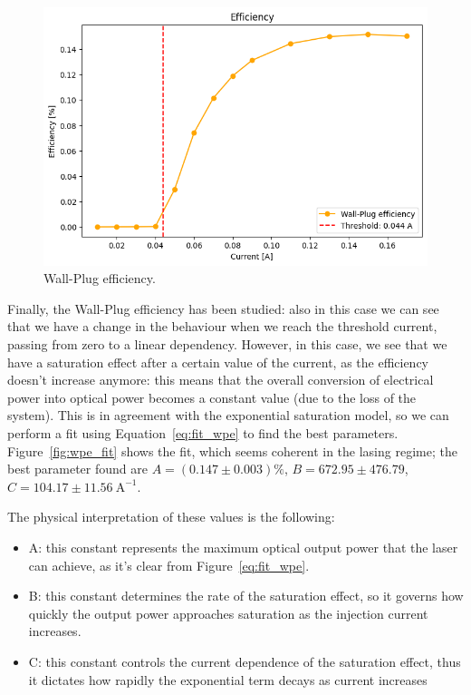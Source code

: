 \documentclass[prl,twocolumn]{revtex4-1}
\begin{document}
\begin{figure}[!b]
    \centering
    \includegraphics[width=\linewidth]{Images/wpe.png}
    \caption{Wall-Plug efficiency.}
    \label{fig:wpe}
\end{figure}

Finally, the Wall-Plug efficiency has been studied: also in this case we can see that we have a change in the behaviour when we reach the threshold current, passing from zero to a linear dependency. However, in this case, we see that we have a saturation effect after a certain value of the current, as the efficiency doesn't increase anymore: this means that the overall conversion of electrical power into optical
power becomes a constant value (due to the loss of the system). This is in agreement with the exponential saturation model, so we can perform a fit using Equation~\eqref{eq:fit_wpe} to find the best parameters. Figure~\ref{fig:wpe_fit} shows the fit, which seems coherent in the lasing regime; the best parameter found are $A = (0.147 \pm 0.003) \%$, $B = 672.95 \pm 476.79$, $C = 104.17 \pm 11.56 \SI{}{\ampere}^{-1}$. 

The physical interpretation of these values is the following:

\begin{itemize}
    \item A: this constant represents the maximum optical output power that the laser can achieve, as it's clear from Figure~\ref{eq:fit_wpe}.
    \item B: this constant determines the rate of the saturation effect, so it governs how quickly the output power approaches saturation as the injection current increases.
    \item C: this constant controls the current dependence of the saturation effect, thus it dictates how rapidly the exponential term decays as current increases
\end{itemize}
\end{document}
